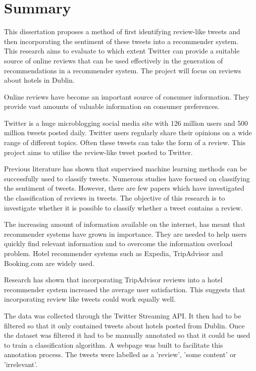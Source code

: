 \chapter{Summary}

This dissertation proposes a method of first identifying review-like tweets and then incorporating the sentiment of these tweets into a recommender system. This research aims to evaluate to which extent Twitter can provide a suitable source of online reviews that can be used effectively in the generation of recommendations in a recommender system. The project will focus on reviews about hotels in Dublin.

Online reviews have become an important source of consumer information. They provide vast amounts of valuable information on consumer preferences.

Twitter is a huge microblogging social media site with 126 million users and 500 million tweets posted daily. Twitter users regularly share their opinions on a wide range of different topics. Often these tweets can take the form of a review. This project aims to utilise the review-like tweet posted to Twitter.

Previous literature has shown that supervised machine learning methods can be successfully used to classify tweets. Numerous studies have focused on classifying the sentiment of tweets. However, there are few papers which have investigated the classification of reviews in tweets. The objective of this research is to investigate whether it is possible to classify whether a tweet contains a review.

The increasing amount of information available on the internet, has meant that recommender systems have grown in importance. They are needed to help users quickly find relevant information and to overcome the information overload problem. Hotel recommender systems such as Expedia, TripAdvisor and Booking.com are widely used.

Research has shown that incorporating TripAdvisor reviews into a hotel recommender system increased the average user satisfaction. This suggests that incorporating review like tweets could work equally well. 

The data was collected through the Twitter Streaming API. It then had to be filtered so that it only contained tweets about hotels posted from Dublin. Once the dataset was filtered it had to be manually annotated so that it could be used to train a classification algorithm. A webpage was built to facilitate this annotation process. The tweets were labelled as a 'review', 'some content' or 'irrelevant'.

